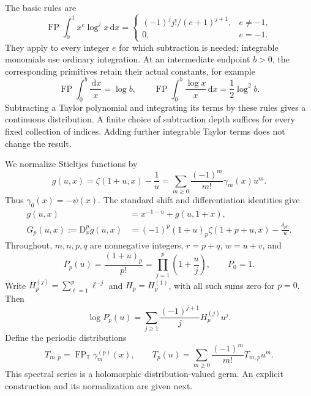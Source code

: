 \documentclass[11pt,a4paper]{article}
\numberwithin{equation}{section}
\theoremstyle{definition}
\newcommand{\T}{\mathbb T}
\newcommand{\dd}{\,\mathrm dx}
\newcommand{\D}{\mathrm D}
\newcommand{\FP}{\operatorname{FP}}
\begin{document}
The basic rules are
\begin{equation}\label{pc:fpmonomial}
 \FP\int_0^1x^e\log^j x\dd=
 \begin{cases}
 (-1)^j j!/(e+1)^{j+1},&e\ne-1,\\
 0,&e=-1.
 \end{cases}
\end{equation}
They apply to every integer $e$ for which subtraction is needed; integrable monomials use ordinary integration. At an intermediate endpoint $b>0$, the corresponding primitives retain their actual constants, for example
\[
 \FP\int_0^b\frac{\dd}{x}=\log b,
 \qquad \FP\int_0^b\frac{\log x}{x}\dd=\frac12\log^2b.
\]
Subtracting a Taylor polynomial and integrating its terms by these rules gives a continuous distribution. A finite choice of subtraction depth suffices for every fixed collection of indices. Adding further integrable Taylor terms does not change the result.

We normalize Stieltjes functions by
\begin{equation}\label{pc:gdef}
 g(u,x)=\zeta(1+u,x)-\frac1u
 =\sum_{m\ge0}\frac{(-1)^m}{m!}\gamma_m(x)u^m.
\end{equation}
Thus $\gamma_0(x)=-\psi(x)$. The standard shift and differentiation identities \cite{pc:DLMFhurwitz} give
\begin{align}
 g(u,x)&=x^{-1-u}+g(u,1+x),\label{pc:gshift}\\
 G_p(u,x):=\D_x^pg(u,x)
 &=(-1)^p(1+u)_p\zeta(1+p+u,x)-\frac{\delta_{p0}}u.\label{pc:G}
\end{align}
Throughout, $m,n,p,q$ are nonnegative integers, $r=p+q$, $w=u+v$, and
\begin{equation}\label{pc:P}
 P_p(u)=\frac{(1+u)_p}{p!}
 =\prod_{j=1}^p\left(1+\frac uj\right),\qquad P_0=1.
\end{equation}
Write $H_p^{(j)}=\sum_{\ell=1}^p\ell^{-j}$ and $H_p=H_p^{(1)}$, with all such sums zero for $p=0$. Then
\begin{equation}\label{pc:logP}
 \log P_p(u)=\sum_{j\ge1}\frac{(-1)^{j+1}}jH_p^{(j)}u^j.
\end{equation}
Define the periodic distributions
\begin{equation}\label{pc:Tdef}
 T_{m,p}=\FP_{\T}\gamma_m^{(p)}(x),\qquad
 T_p(u)=\sum_{m\ge0}\frac{(-1)^m}{m!}T_{m,p}u^m.
\end{equation}
This spectral series is a holomorphic distribution-valued germ. An explicit construction and its normalization are given next.
\end{document}
